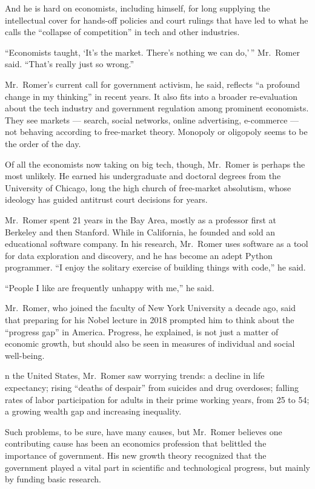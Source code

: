 \documentclass[
]{book}
\begin{document}
And he is hard on economists, including himself, for long supplying the intellectual cover for hands-off policies and court rulings that have led to what he calls the ``collapse of competition'' in tech and other industries.

``Economists taught, `It's the market. There's nothing we can do,'\,'' Mr.~Romer said. ``That's really just so wrong.''

Mr.~Romer's current call for government activism, he said, reflects ``a profound change in my thinking'' in recent years.
It also fits into a broader re-evaluation about the tech industry and government regulation among prominent economists.
They see markets --- search, social networks, online advertising, e-commerce --- not behaving according to free-market theory. Monopoly or oligopoly seems to be the order of the day.

Of all the economists now taking on big tech, though, Mr.~Romer is perhaps the most unlikely. He earned his undergraduate and doctoral degrees from the University of Chicago, long the high church of free-market absolutism, whose ideology has guided antitrust court decisions for years.

Mr.~Romer spent 21 years in the Bay Area, mostly as a professor first at Berkeley and then Stanford. While in California, he founded and sold an educational software company. In his research, Mr.~Romer uses software as a tool for data exploration and discovery, and he has become an adept Python programmer. ``I enjoy the solitary exercise of building things with code,'' he said.

``People I like are frequently unhappy with me,'' he said.

Mr.~Romer, who joined the faculty of New York University a decade ago, said that preparing for his Nobel lecture in 2018 prompted him to think about the ``progress gap'' in America. Progress, he explained, is not just a matter of economic growth, but should also be seen in measures of individual and social well-being.

n the United States, Mr.~Romer saw worrying trends: a decline in life expectancy; rising ``deaths of despair'' from suicides and drug overdoses; falling rates of labor participation for adults in their prime working years, from 25 to 54; a growing wealth gap and increasing inequality.

Such problems, to be sure, have many causes, but Mr.~Romer believes one contributing cause has been an economics profession that belittled the importance of government. His new growth theory recognized that the government played a vital part in scientific and technological progress, but mainly by funding basic research.
\end{document}
